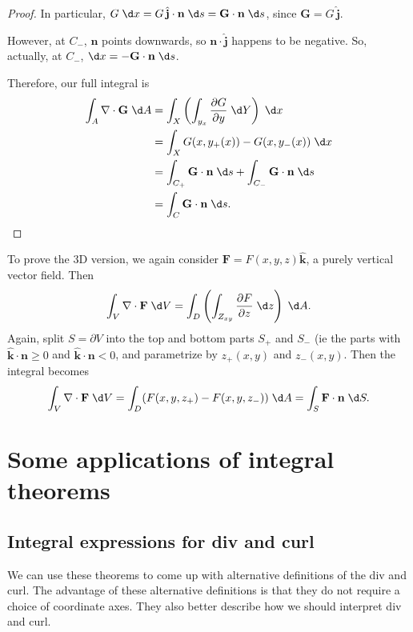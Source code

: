 \documentclass[a4paper]{article}
\begin{document}
\begin{proof}
  In particular, $G\;\d x = G\,\hat{\mathbf{j}}\cdot \mathbf{n}\;\d s = \mathbf{G}\cdot \mathbf{n}\;\d s$, since $\mathbf{G} = G\,\hat{\mathbf{j}}$.

  However, at $C_-$, $\mathbf{n}$ points downwards, so $\mathbf{n}\cdot \hat{\mathbf{j}}$ happens to be negative. So, actually, at $C_-$, $\d x = -\mathbf{G}\cdot \mathbf{n}\;\d s$.

  Therefore, our full integral is
  \begin{align*}
    \int_A \nabla\cdot \mathbf{G}\;\d A &= \int_X \left(\int_{y_x}\frac{\partial G}{\partial y}\;\d Y\right)\;\d x\\
    &= \int_X G(x, y_+(x)) - G(x, y_{-}(x))\;\d x\\
    &= \int_{C_+}\mathbf{G}\cdot \mathbf{n}\;\d s + \int_{C_-}\mathbf{G}\cdot \mathbf{n}\;\d s\\
    &= \int_C \mathbf{G}\cdot \mathbf{n}\;\d s.
  \end{align*}
\end{proof}

To prove the 3D version, we again consider $\mathbf{F} = F(x, y, z)\hat{\mathbf{k}}$, a purely vertical vector field. Then
\[
  \int_V \nabla\cdot \mathbf{F}\;\d V = \int_D \left(\int_{Z_{xy}} \frac{\partial F}{\partial z}\;\d z\right)\;\d A.
\]
Again, split $S = \partial V$ into the top and bottom parts $S_+$ and $S_-$ (ie the parts with $\hat{\mathbf{k}}\cdot \mathbf{n} \geq 0$ and $\hat{\mathbf{k}}\cdot \mathbf{n} < 0$, and parametrize by $z_+(x, y)$ and $z_-(x, y)$. Then the integral becomes
\[
  \int_V \nabla\cdot \mathbf{F}\;\d V = \int_D (F(x, y, z_+) - F(x, y, z_-))\;\d A = \int_S \mathbf{F}\cdot \mathbf{n}\;\d S.
\]
\section{Some applications of integral theorems}
\subsection{Integral expressions for div and curl}
We can use these theorems to come up with alternative definitions of the div and curl. The advantage of these alternative definitions is that they do not require a choice of coordinate axes. They also better describe how we should interpret div and curl.
\end{document}
